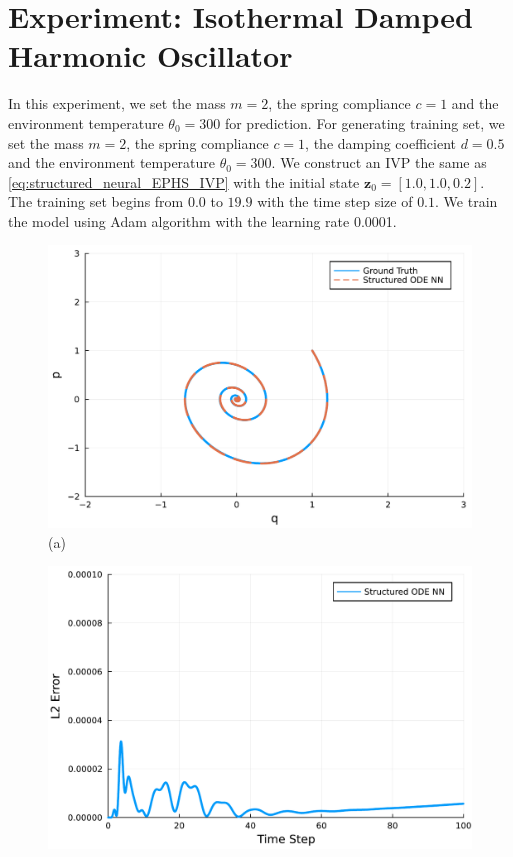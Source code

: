 \documentclass[
	parskip, 			   %
	twoside, 			   %
	DIV=14, 			   %
	BCOR=15.0mm, 		   %
	headsepline, 		   %
	open=right, 		   %
	captions=tableheading, %
	bibliography=totoc,    %
	numbers=noenddot       %
]{scrreprt}
\begin{document}
\clearpage
\section{Experiment: Isothermal Damped Harmonic Oscillator}
In this experiment, we set the mass $m=2$, the spring compliance $c=1$ and the environment temperature $\theta_{0}=300$ for prediction. For generating training set, we set the mass $m=2$, the spring compliance $c=1$, the damping coefficient $d=0.5$ and the environment temperature $\theta_{0}=300$. We construct an IVP the same as \ref{eq:structured_neural_EPHS_IVP} with the initial state $\mathbf{z}_{0} = [1.0, 1.0, 0.2]$. The training set begins from $0.0$ to $19.9$ with the time step size of $0.1$. We train the model using Adam algorithm with the learning rate 0.0001.

\begin{figure}[h!]
    \centering
    \begin{minipage}{.3\textwidth}
    \centering
    \includegraphics[width=1\linewidth]{figures/phase_portrait_compositional_idho.pdf}
    \\(a)
    \end{minipage}%
    \begin{minipage}{.3\textwidth}
    \centering
    \includegraphics[width=1\linewidth]{figures/prediction_error_compositional_idho.pdf}

\end{minipage}
\end{figure}
\end{document}
